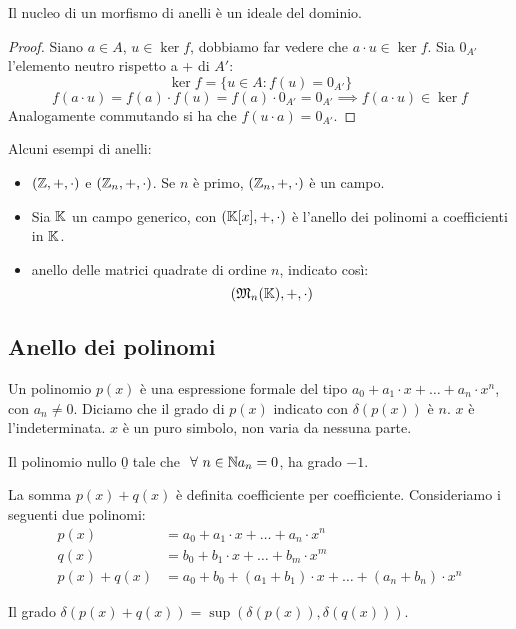 \begin{prop}
Il nucleo di un morfismo di anelli \`e un ideale del dominio.
\end{prop}
\begin{proof}
Siano $a \in A$, $u \in \ker f$, dobbiamo far vedere che $a \cdot u \in \ker f$. Sia $0_{A'}$ l'elemento neutro rispetto a + di $A'$:
\[
\ker f = \{ u \in A : f(u) = 0_{A'} \}
\]
\[
f(a \cdot u) = f(a) \cdot f(u) = f(a) \cdot 0_{A'} = 0_{A'} \implies f(a \cdot u) \in \ker f
\]
Analogamente commutando si ha che $f(u \cdot a) = 0_{A'}$.
\end{proof}

Alcuni esempi di anelli:
\begin{itemize}
    \item $(\mathbb{Z}, +, \cdot)$ e $ (\mathbb{Z}_n, +, \cdot)$. Se $n$ \`e primo, $(\mathbb{Z}_n, +, \cdot)$ \`e un campo.
    \item Sia $\mathbb{K}$ un campo generico, con $(\mathbb{K}[x], +, \cdot) $ \`e l'anello dei polinomi a coefficienti in $\mathbb{K} $.
    \item anello delle matrici quadrate di ordine $n$, indicato cos\`i:
    \[
    (\mathfrak{M}_n(\mathbb{K}), +, \cdot)
    \]
\end{itemize}

\subsection{Anello dei polinomi}

Un polinomio $p(x)$ \`e una espressione formale del tipo $a_0 + a_1 \cdot x + \dots + a_n \cdot x^n$, con $a_n \neq 0$. Diciamo che il grado di $p(x)$ indicato con $\delta(p(x))$ \`e $n$. $x$ \`e l'indeterminata. $x$ \`e un puro simbolo, non varia da nessuna parte. 

Il polinomio nullo $\underline{0}$ tale che $\forall n \in \naturals a_n = 0$, ha grado $-1$.

La somma $p(x) + q(x)$ \`e definita coefficiente per coefficiente. Consideriamo i seguenti due polinomi:
\begin{align*}
p(x) &= a_0 + a_1 \cdot x + \dots + a_n \cdot x^n \\
q(x) &= b_0 + b_1 \cdot x + \dots + b_m \cdot x^m \\
p(x) + q(x) &= a_0 + b_0 + (a_1 + b_1) \cdot x + \dots + (a_n + b_n) \cdot x^n
\end{align*}

Il grado $\delta(p(x) + q(x)) = \sup( \delta(p(x)) , \delta(q(x)))$.

